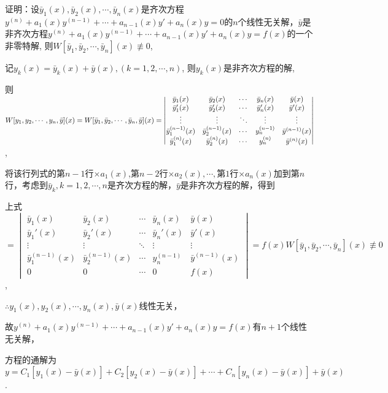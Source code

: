\documentclass[12pt,UTF8,fleqn]{ctexart}
\begin{document}
\begin{enumerate}
证明：设$\bar{y}_1(x),\bar{y}_2(x),\cdots,\bar{y}_n(x)$是齐次方程$y^{(n)}+a_1(x)y^{(n-1)}+\cdots+a_{n-1}(x)y'+a_n(x)y=0$的$n$个线性无关解，$\bar{y}$是非齐次方程$y^{(n)}+a_1(x)y^{(n-1)}+\cdots+a_{n-1}(x)y'+a_n(x)y=f(x)$的一个非零特解, 则$W[\bar y_1,\bar y_2,\cdots,\bar y_n](x)\not\equiv0$,

记$y_k(x)=\bar{y}_k(x)+\bar y(x),(k=1,2,\cdots,n)$, 则$y_k(x)$是非齐次方程的解,

则$W[y_1,y_2,\cdots,y_n,\bar y](x)\\
=W[\bar y_1,\bar y_2,\cdots,\bar y_n,\bar y](x)\\
=\begin{vmatrix}
\bar y_1(x)&\bar y_2(x)&\cdots&\bar y_n(x)&\bar y(x)\\
\bar y_1'(x)&\bar y_2'(x)&\cdots&\bar y_n'(x)&\bar y'(x)\\
\vdots&\vdots&\ddots&\vdots&\vdots\\
\bar y_1^{(n-1)}(x)&\bar y_2^{(n-1)}(x)&\cdots&y_{n}^{(n-1)}&\bar y^{(n-1)}(x)\\
\bar y_1^{(n)}(x)&\bar y_2^{(n)}(x)&\cdots&y_{n}^{(n)}&\bar y^{(n)}(x)
\end{vmatrix}$,

将该行列式的第$n-1$行$\times a_1(x)$,第$n-2$行$\times a_2(x),\cdots,$第$1$行$\times a_n(x)$加到第$n$行，考虑到$\bar y_k,k=1,2,\cdots,n$是齐次方程的解，$\bar y$是非齐次方程的解，得到

上式$=\begin{vmatrix}
\bar y_1(x)&\bar y_2(x)&\cdots&\bar y_n(x)&\bar y(x)\\
\bar y_1'(x)&\bar y_2'(x)&\cdots&\bar y_n'(x)&\bar y'(x)\\
\vdots&\vdots&\ddots&\vdots&\vdots\\
\bar y_1^{(n-1)}(x)&\bar y_2^{(n-1)}(x)&\cdots&y_{n}^{(n-1)}&\bar y^{(n-1)}(x)\\
0&0&\cdots&0&f(x)
\end{vmatrix}=f(x)W[\bar y_1,\bar y_2,\cdots,\bar y_n](x)\not\equiv0$,

$\therefore y_1(x),y_2(x),\cdots,y_n(x),\bar y(x)$线性无关，

故$y^{(n)}+a_1(x)y^{(n-1)}+\cdots+a_{n-1}(x)y'+a_n(x)y=f(x)$有$n+1$个线性无关解，

方程的通解为$y=C_1[y_1(x)-\bar y(x)]+C_2[y_2(x)-\bar y(x)]+\cdots+C_{n}[y_n(x)-\bar y(x)]+\bar y(x)$.
\end{enumerate}
\end{document}
